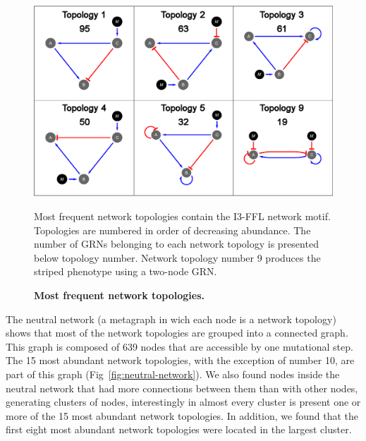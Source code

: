 \documentclass[10pt,letterpaper]{article}
\begin{document}
\begin{figure}[!h]
 \includegraphics[width=\textwidth]{figures/results/most-abu-topol}
 \caption{\bf Most frequent network topologies.}
 Most frequent network topologies contain the I3-FFL network motif. Topologies 
 are numbered in order of decreasing abundance.
 The number of GRNs belonging to each network topology is presented below 
 topology number.
 Network topology number 9 produces the striped phenotype using a two-node GRN.
 \label{fig:topol}
\end{figure}

The neutral network (a metagraph in wich each node is a network topology) 
shows that most of the network topologies are grouped into a connected graph.
This graph is composed of 639 nodes that are accessible by one mutational step.
The 15 most abundant network topologies, with the exception of 
number 10, are part of this graph (Fig~\ref{fig:neutral-network}). We also 
found nodes inside the neutral network that had more connections between them 
than with other nodes, generating clusters of nodes, interestingly in 
almost every cluster is present one or more of the 15 most abundant network 
topologies. In addition, we found that the first eight most abundant network 
topologies were located in the largest cluster.
\end{document}
